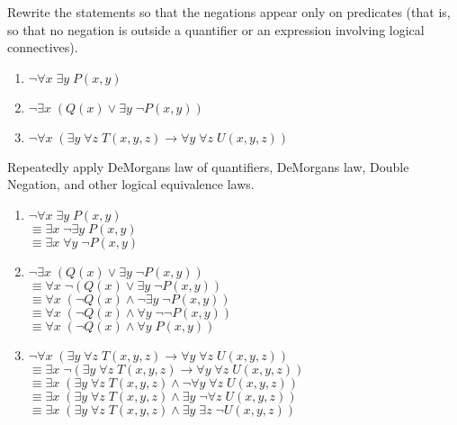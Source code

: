 \documentclass[12pt,addpoints]{exam}
\newcommand{\ra}{\rightarrow}
\begin{document}
\begin{questions}
\question[6] Rewrite the statements so that the negations appear only on predicates (that is, so that no negation is outside a quantifier or an expression involving logical connectives).
	\begin{enumerate}[label=(\alph*),itemsep=0pt,parsep=0pt,
    	topsep=0pt,partopsep=0pt]
    	\item $\neg \forall x\; \exists y\; P(x,y)$
    	\item $\neg \exists x\; (Q(x) \vee \exists y\; \neg P(x,y))$
    	\item $\neg \forall x\; (\exists y\; \forall z\; T(x,y,z) \ra \forall y\; \forall z\; U(x,y,z))$
    \end{enumerate}
    \ifprintanswers
        \vspace{-12pt}
    \fi
\begin{solution} Repeatedly apply DeMorgans law of quantifiers, DeMorgans law, Double Negation, and other logical equivalence laws.
	\begin{enumerate}[label=(\alph*),itemsep=0pt,parsep=0pt,
    	topsep=0pt,partopsep=0pt]
    	\item $\neg \forall x\; \exists y\; P(x,y)$ \\
    		$ \equiv \exists x\; \neg \exists y\; P(x,y)$ \\
    		$ \equiv \exists x\; \forall y\; \neg P(x,y)$ 
    		
    	\item $\neg \exists x\; (Q(x) \vee \exists y\; \neg P(x,y))$ \\
    		$ \equiv \forall x\; \neg (Q(x) \vee \exists y\; \neg P(x,y))$ \\
    		$ \equiv \forall x\; (\neg Q(x) \wedge \neg \exists y\; \neg P(x,y))$ \\
    		$\equiv \forall x\; (\neg Q(x) \wedge \forall y\; \neg \neg P(x,y))$ \\
    		$ \equiv \forall x\; (\neg Q(x) \wedge \forall y\; P(x,y))$ 
    		
    	\item $\neg \forall x\; (\exists y\; \forall z\; T(x,y,z) \ra \forall y\; \forall z\; U(x,y,z))$ \\
    		$ \equiv \exists x\; \neg (\exists y\; \forall z\; T(x,y,z) \ra \forall y\; \forall z\; U(x,y,z))$ \\
    		$ \equiv \exists x\; (\exists y\; \forall z\; T(x,y,z) \wedge \neg \forall y\; \forall z\; U(x,y,z))$ \\
    		$ \equiv \exists x\; (\exists y\; \forall z\; T(x,y,z) \wedge \exists y\; \neg \forall z\; U(x,y,z))$ \\
    		$ \equiv \exists x\; (\exists y\; \forall z\; T(x,y,z) \wedge \exists y\; \exists z\; \neg U(x,y,z))$ \\
    \end{enumerate}
\end{solution}




\end{questions}
\end{document}
